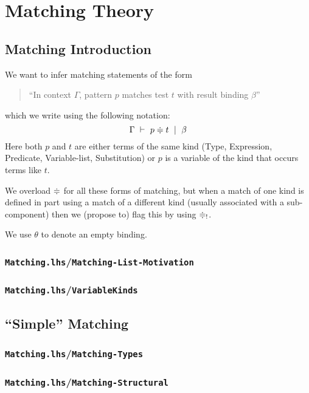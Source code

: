 \section{Matching Theory}

\subsection{Matching Introduction}

We want to infer matching statements of the form
\begin{quote}
``In context $\Gamma$, pattern $p$ matches test $t$
with result binding $\beta$''
\end{quote}
which we write using the following notation:
\[
\Gamma \mathrel{~\vdash~} p \mathrel{\doteqdot} t \mathrel{~|~} \beta
\]
Here both $p$ and $t$ are either terms of the same kind
(Type, Expression, Predicate,
Variable-list, Substitution)
or $p$ is a variable of the kind that occurs terms like $t$.

We overload $\mathrel{\doteqdot}$ for all these forms of matching,
but when a match of one kind is defined in part using
a match of a different kind
(usually associated with a sub-component)
then we (propose to) flag this by using $\mathrel{\doteqdot}_!$.

We use $\theta$ to denote an empty binding.




\subsubsection{\texttt{Matching.lhs}/\texttt{Matching-List-Motivation}}


\subsubsection{\texttt{Matching.lhs}/\texttt{VariableKinds}}


\subsection{``Simple'' Matching}

\subsubsection{\texttt{Matching.lhs}/\texttt{Matching-Types}}


\subsubsection{\texttt{Matching.lhs}/\texttt{Matching-Structural}}


